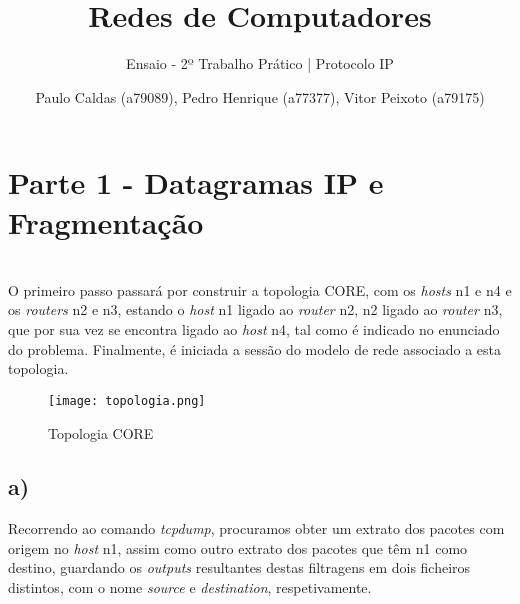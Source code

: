 \documentclass{llncs}
\begin{document}
\title{Redes de Computadores}
\subtitle{Ensaio - 2º Trabalho Prático | Protocolo IP}

\author{Paulo Caldas (a79089), Pedro Henrique (a77377), Vitor Peixoto (a79175)}



\setlength{\voffset}{2in} 	%
\maketitle              	%

\newpage
\vspace{-1.9em}

\section*{Parte 1 - Datagramas IP e Fragmentação}
\small

\section{}

O primeiro passo passará por construir a topologia CORE, com os \textit{hosts} n1 e n4 e os \textit{routers} n2 e n3, estando o \textit{host} n1 ligado ao \textit{router} n2, n2 ligado ao \textit{router} n3, que por sua vez se encontra ligado ao \textit{host} n4, tal como é indicado no enunciado do problema. Finalmente, é iniciada a sessão do modelo de rede associado a esta topologia.

\begin{figure}[!hb]
    \begin{center}
        \texttt{[image: topologia.png]}
        \caption{Topologia CORE}
    \end{center}
\end{figure}
\vspace{-4.3em}

\subsection*{a)}

Recorrendo ao comando \textit{tcpdump}, procuramos obter um extrato dos pacotes com origem no \textit{host} n1, assim como outro extrato dos pacotes que têm n1 como destino, guardando os \textit{outputs} resultantes destas filtragens em dois ficheiros distintos, com o nome \textit{source} e \textit{destination}, respetivamente.
\end{document}
